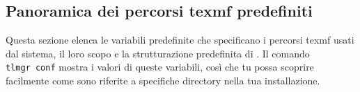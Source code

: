 \documentclass{article}
\begin{document}
\subsection{Panoramica dei percorsi texmf predefiniti}
\label{sec:texmftrees}

Questa sezione elenca le variabili predefinite che specificano i percorsi
texmf usati dal sistema, il loro scopo e la strutturazione predefinita di
\TL{}.  Il comando \texttt{tlmgr~conf} mostra i valori di queste
variabili, così che tu possa scoprire facilmente come sono riferite a
specifiche directory nella tua installazione.
\end{document}
